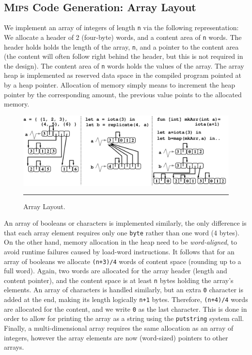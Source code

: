 \documentclass[a4paper,11pt]{article}
\newcommand{\mips}{\textsc{Mips}\xspace}
\begin{document}
\subsection*{\mips Code Generation: Array Layout}

We implement an array of integers of length {\tt n} via the following
representation: We allocate a header of 2 (four-byte) words, and a content 
area of {\tt n} words. The header holds holds the length of the array, 
{\tt n}, and a pointer to the content area (the content will often follow
right behind the header, but this is not required in the design).
The content area of {\tt n} words holds the values of the array. 
The array heap is implemented as reserved data space in the compiled program
pointed at by a heap pointer. Allocation of memory simply means to increment
the heap pointer by the corresponding amount, the previous value points to 
the allocated memory.

\begin{figure}[t]%
\includegraphics[scale=0.35]{Figures/ArraysPrecise}
\hrule
\caption{Array Layout.}
\label{fig:ArrLayout} %
\end{figure}

An array of booleans or characters is implemented similarly, the only difference
is that each array element requires only one {\tt byte}
rather than one word (4 bytes). On the other hand, memory allocation in the heap 
need to be \emph{word-aligned}, to avoid runtime failures caused by load-word instructions.
It follows that for an array of booleans we allocate
{\tt (n+3)/4} words of content space (rounding up to a full word).
Again, two words are allocated for the array header (length and content pointer),
and the content space is at least {\tt n} bytes holding the array's elements.
An array of characters is handled similarly, but an extra \texttt{0} character
is added at the end, making its length logically {\tt n+1} bytes.
Therefore, {\tt (n+4)/4} words are allocated for the content, and we write {\tt 0} as 
the last character. This is done in order to allow for printing the array as a string 
using the {\tt putstring} system call.
%
Finally, a multi-dimensional array requires the same allocation as an array of integers,
however the array elements are now (word-sized) pointers to other arrays.
\end{document}
